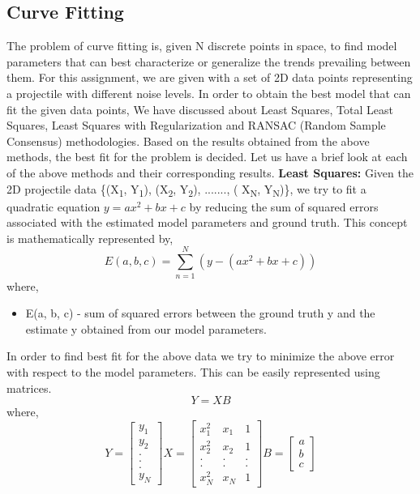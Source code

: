 \documentclass{article}
\begin{document}
\subsection{Curve Fitting}
The problem of curve fitting is, given N discrete points in space, to find model parameters that can best characterize or generalize the trends prevailing between them. For this assignment, we are given with a set of 2D data points representing a projectile with different noise levels. In order to obtain the best model that can fit the given data points, We have discussed about Least Squares, Total Least Squares, Least Squares with Regularization and RANSAC (Random Sample Consensus) methodologies. Based on the results obtained from the above methods, the best fit for the problem is decided. Let us have a brief look at each of the above methods and their corresponding results.
\newline \newline \textbf{Least Squares:}
\newline Given the 2D projectile data \{(X\textsubscript{1}, Y\textsubscript{1}), (X\textsubscript{2}, Y\textsubscript{2}), ......., ( X\textsubscript{N}, Y\textsubscript{N})\}, we try to fit a quadratic equation $y = a{x^2} + bx + c$ by reducing the sum of squared errors associated with the estimated model parameters and ground truth. This concept is mathematically represented by,
\begin{equation}
\boxed{E(a, b, c) = \sum_{n = 1}^{N} (y - (a{x^2} + bx + c))}
\end{equation}
where,
\begin{itemize}
    \item E(a, b, c) - sum of squared errors between the ground truth y and the estimate y obtained from our model parameters. 
\end{itemize}
In order to find best fit for the above data we try to minimize the above error with respect to the model parameters. This can be easily represented using matrices.
\begin{equation}
\boxed{Y = XB}
\end{equation}
where, 
\begin{equation}
\boxed{Y = 
\begin{bmatrix}
y_1 \\ y_2 \\ . \\ . \\ . \\ y_N
\end{bmatrix}
X = 
\begin{bmatrix}
x^2_1 & x_1 & 1 \\ x^2_2 & x_2 & 1 \\ . & . & . \\ . & . & . \\
x^2_N & x_N & 1 
\end{bmatrix}
B = 
\begin{bmatrix}
a \\ b \\ c
\end{bmatrix}}
\end{equation}
\end{document}
